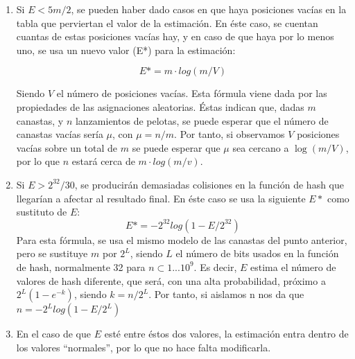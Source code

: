 \begin{enumerate}
\item Si $E < 5m/2$, se pueden haber dado casos en que haya posiciones vacías en la tabla que
perviertan el valor de la estimación. En éste caso, se cuentan cuantas de estas posiciones vacías
hay, y en caso de que haya por lo menos uno, se usa un nuevo valor (E*) para la estimación: 

$$E* = m \cdot log(m/V)$$

Siendo $V$ el número de posiciones vacías. Esta fórmula viene dada por las propiedades de las
asignaciones aleatorias. Éstas indican que, dadas $m$ canastas, y $n$ lanzamientos de pelotas,
se puede esperar que el número de canastas vacías sería $\mu$, con $\mu = n / m$. Por tanto, si
observamos $V$ posiciones vacías sobre un total de $m$
se puede esperar que $\mu$ sea cercano a $\log(m/V)$, por lo que $n$ estará cerca de
$m \cdot log(m/v)$.

\item Si $E > 2^{32}/30$, se producirán demasiadas colisiones en la función de hash que llegarían a
afectar al resultado final. En éste caso se usa la siguiente $E*$ como sustituto de $E$:
$$E* = -2^{32}log(1-E/2^{32})$$
Para esta fórmula, se usa el mismo modelo de las canastas del punto anterior, pero se sustituye $m$
por $2^L$, siendo $L$ el número de bits usados en la función de hash, normalmente 32 para $n
\subset 1...10^9$. Es decir, $E$ estima el número de valores de hash diferente, que será, con una
alta probabilidad, próximo a $2^L(1-e^{-k})$, siendo $k = n/2^L$. Por tanto, si aislamos n nos da
que 
$n=-2^Llog(1-E/2^L)$
\\

\item En el caso de que $E$ esté entre éstos dos valores, la estimación entra dentro de los valores
“normales”, por lo que no hace falta modificarla.

\end{enumerate}
